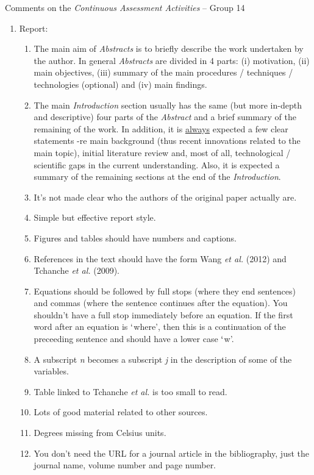 \documentclass[14pt,twoside]{report}
\begin{document}
\clearpage


\clearpage



\bigskip

\begin{center}
  {\Large Comments on the {\it Continuous Assessment Activities} -- Group 14}
\end{center}

\begin{enumerate}

\item Report:
\begin{enumerate}
%
\item The main aim of {\it Abstracts} is to briefly describe the work undertaken by the author. In general {\it Abstracts} are divided in 4 parts: (i) motivation, (ii) main objectives, (iii) summary of the main procedures / techniques / technologies (optional) and (iv) main findings. 
%
\item The main {\it Introduction} section usually has the same (but more in-depth and descriptive) four parts of the {\it Abstract} and a brief summary of the remaining of the work. In addition, it is \underline{always} expected a few clear statements -re main background (thus recent innovations related to the main topic), initial literature review and, most of all, technological / scientific gaps in the current understanding. Also, it is expected a summary of the remaining sections at the end of the {\it Introduction}.
%
\item It's not made clear who the authors of the original paper actually are.
%
\item Simple but effective report style.
%
\item Figures and tables should have numbers and captions.
%
\item References in the text should have the form Wang {\it et al.} (2012) and Tchanche {\it et al.} (2009).
%
\item Equations should be followed by full stops (where they end sentences) and commas (where the sentence continues after the equation). You shouldn't have a full stop immediately before an equation. If the first word after an equation is $\lq$where', then this is a continuation of the preceeding sentence and should have a lower case $\lq$w'.
%
\item A subscript {\it n} becomes a subscript {\it j} in the description of some of the variables.
%
\item Table linked to Tchanche {\it et al.} is too small to read.
%
\item Lots of good material related to other sources.
%
\item Degrees missing from Celsius units.
%
\item You don't need the URL for a journal article in the bibliography, just the journal name, volume number and page number.


\end{enumerate}
\end{enumerate}
\end{document}
